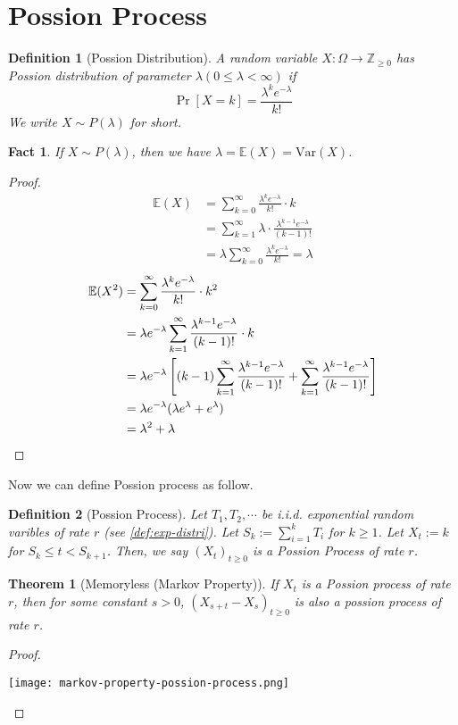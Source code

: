 \documentclass{article}
\newtheorem{fact}{Fact}[section]
\newtheorem{define}{Definition}[section]
\newtheorem{theorem}{Theorem}[section]
\begin{document}
\section{Possion Process}
\begin{define}[Possion Distribution]
  A random variable $X: \Omega \to \mathbb{Z}_{\geq 0}$ has Possion distribution of parameter $\lambda (0 \leq \lambda < \infty)$ if 
  \[\Pr[X = k] = \frac{\lambda^k e^{-\lambda}}{k!}\]
  We write $X\sim P(\lambda)$ for short.
\end{define}
\begin{fact}
    If $X\sim P(\lambda)$, then we have $\lambda = \mathbb{E}(X) = \mathrm{Var}(X)$.
\end{fact}
\begin{proof}
  \begin{align*}
    \mathbb{E}(X)
    &= \sum_{k = 0}^\infty \frac{\lambda^k e^{-\lambda}}{k!} \cdot k \\
    &= \sum_{k = 1}^\infty \lambda \cdot \frac{\lambda^{k-1}e^{-\lambda}}{(k-1)!} \\
    &= \lambda \sum_{k=0}^\infty \frac{\lambda^k e^{-\lambda}}{k!} = \lambda
  \end{align*}
  \begin{align*}
    \mathbb{E}(X^2)
    &= \sum_{k=0}^\infty \frac{\lambda^k e^{-\lambda}}{k!} \cdot k^2 \\
    &= \lambda e^{-\lambda} \sum_{k=1}^\infty \frac{\lambda^{k-1} e^{-\lambda}}{(k-1)!}\cdot k \\
    &= \lambda e^{-\lambda} \left[(k-1) \sum_{k=1}^\infty \frac{\lambda^{k-1} e^{-\lambda}}{(k-1)!} + \sum_{k=1}^\infty \frac{\lambda^{k-1} e^{-\lambda}}{(k-1)!} \right]\\
    &= \lambda e^{-\lambda} (\lambda e^\lambda + e^\lambda) \\
    &= \lambda^2 + \lambda \qedhere 
  \end{align*}
\end{proof}

Now we can define Possion process as follow.
\begin{define}[Possion Process]
  Let $T_1, T_2, \cdots$ be i.i.d. exponential random varibles of rate $r$ (see \ref{def:exp-distri}).
  Let $S_k := \sum_{i=1}^k T_i$ for $k\geq 1$.
  Let $X_t := k$ for $S_k \leq t < S_{k+1}$.
  Then, we say $(X_t)_{t\geq 0}$ is a Possion Process of rate $r$.
\end{define}
\begin{theorem}[Memoryless (Markov Property)] \label{thm:possion-memoryless}
  If $X_t$ is a Possion process of rate $r$, then for some constant $s > 0$, $(X_{s+t} - X_s)_{t\geq 0}$ is also a possion process of rate $r$.
\end{theorem}
\begin{proof}
  \begin{center}
    \texttt{[image: markov-property-possion-process.png]}
  \end{center}
\end{proof}
\end{document}
